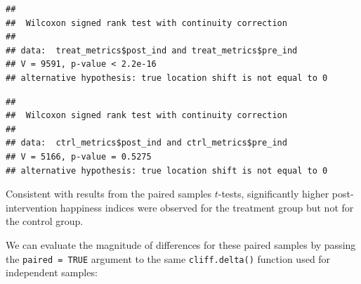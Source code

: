 \documentclass[
]{book}
\newenvironment{Shaded}{\begin{snugshade}}{\end{snugshade}}
\newcommand{\AttributeTok}[1]{\textcolor[rgb]{0.77,0.63,0.00}{#1}}
\newcommand{\CommentTok}[1]{\textcolor[rgb]{0.56,0.35,0.01}{\textit{#1}}}
\newcommand{\ConstantTok}[1]{\textcolor[rgb]{0.00,0.00,0.00}{#1}}
\newcommand{\FunctionTok}[1]{\textcolor[rgb]{0.00,0.00,0.00}{#1}}
\newcommand{\NormalTok}[1]{#1}
\newcommand{\SpecialCharTok}[1]{\textcolor[rgb]{0.00,0.00,0.00}{#1}}
\begin{document}
\begin{Shaded}
\end{Shaded}

\begin{verbatim}
## 
##  Wilcoxon signed rank test with continuity correction
## 
## data:  treat_metrics$post_ind and treat_metrics$pre_ind
## V = 9591, p-value < 2.2e-16
## alternative hypothesis: true location shift is not equal to 0
\end{verbatim}

\begin{Shaded}
\end{Shaded}

\begin{verbatim}
## 
##  Wilcoxon signed rank test with continuity correction
## 
## data:  ctrl_metrics$post_ind and ctrl_metrics$pre_ind
## V = 5166, p-value = 0.5275
## alternative hypothesis: true location shift is not equal to 0
\end{verbatim}

Consistent with results from the paired samples \(t\)-tests, significantly higher post-intervention happiness indices were observed for the treatment group but not for the control group.

We can evaluate the magnitude of differences for these paired samples by passing the \texttt{paired\ =\ TRUE} argument to the same \texttt{cliff.delta()} function used for independent samples:

\begin{Shaded}
\end{Shaded}
\end{document}
